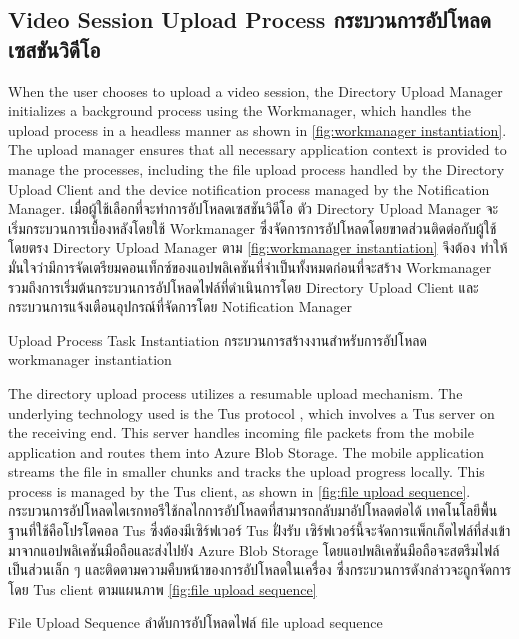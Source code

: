 \subsection{\ifenglish Video Session Upload Process \else กระบวนการอัปโหลดเซสชันวิดีโอ \fi} \label{video-session-upload-process}

\ifenglish
When the user chooses to upload a video session, the Directory Upload Manager initializes a background process using the Workmanager, which handles the upload process in a headless manner as shown in \autoref{fig:workmanager instantiation}. The upload manager ensures that all necessary application context is provided to manage the processes, including the file upload process handled by the Directory Upload Client and the device notification process managed by the Notification Manager.
\else
เมื่อผู้ใช้เลือกที่จะทำการอัปโหลดเซสชันวิดีโอ ตัว Directory Upload Manager จะเริ่มกระบวนการเบื้องหลังโดยใช้ Workmanager ซึ่งจัดการการอัปโหลดโดยขาดส่วนติดต่อกับผู้ใช้โดยตรง Directory Upload Manager ตาม \autoref{fig:workmanager instantiation} จึงต้อง ทำให้มั่นใจว่ามีการจัดเตรียมคอนเท็กซ์ของแอปพลิเคชันที่จำเป็นทั้งหมดก่อนที่จะสร้าง Workmanager รวมถึงการเริ่มต้นกระบวนการอัปโหลดไฟล์ที่ดำเนินการโดย Directory Upload Client และกระบวนการแจ้งเตือนอุปกรณ์ที่จัดการโดย Notification Manager
\fi

{\ifenglish Upload Process Task Instantiation \else กระบวนการสร้างงานสำหรับการอัปโหลด \fi}
{workmanager instantiation}

\ifenglish
The directory upload process utilizes a resumable upload mechanism. The underlying technology used is the Tus protocol \cite{tus-doc}, which involves a Tus server on the receiving end. This server handles incoming file packets from the mobile application and routes them into Azure Blob Storage. The mobile application streams the file in smaller chunks and tracks the upload progress locally. This process is managed by the Tus client, as shown in \autoref{fig:file upload sequence}.
\else
กระบวนการอัปโหลดไดเรกทอรีใช้กลไกการอัปโหลดที่สามารถกลับมาอัปโหลดต่อได้ เทคโนโลยีพื้นฐานที่ใช้คือโปรโตคอล Tus \cite{tus-doc} ซึ่งต้องมีเซิร์ฟเวอร์ Tus ฝั่งรับ เซิร์ฟเวอร์นี้จะจัดการแพ็กเก็ตไฟล์ที่ส่งเข้ามาจากแอปพลิเคชันมือถือและส่งไปยัง Azure Blob Storage โดยแอปพลิเคชันมือถือจะสตรีมไฟล์เป็นส่วนเล็ก ๆ และติดตามความคืบหน้าของการอัปโหลดในเครื่อง ซึ่งกระบวนการดังกล่าวจะถูกจัดการโดย Tus client ตามแผนภาพ \autoref{fig:file upload sequence}
\fi

{\ifenglish File Upload Sequence \else ลำดับการอัปโหลดไฟล์ \fi}
{file upload sequence}

